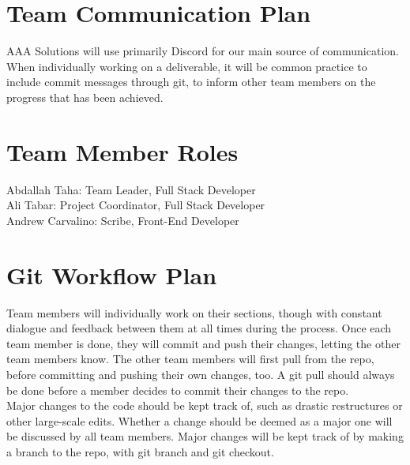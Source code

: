 \documentclass{article}
\begin{document}
\section{Team Communication Plan}
AAA Solutions will use primarily Discord for our main source of communication. When individually working on a deliverable, it will be common practice to include commit messages through git, to inform other team members on the progress that has been achieved. 

\section{Team Member Roles}
Abdallah Taha: Team Leader, Full Stack Developer \\
Ali Tabar: Project Coordinator, Full Stack Developer \\
Andrew Carvalino: Scribe, Front-End Developer \\

\section{Git Workflow Plan}

Team members will individually work on their sections, though with constant dialogue and feedback between them at all times during the process. Once each team member is done, they will commit and push their changes, letting the other team members know. The other team members will first pull from the repo, before committing and pushing their own changes, too. A git pull should always be done before a member decides to commit their changes to the repo.\\
Major changes to the code should be kept track of, such as drastic restructures or other large-scale edits. Whether a change should be deemed as a major one will be discussed by all team members. Major changes will be kept track of by making a branch to the repo, with git branch and git checkout.
\end{document}

